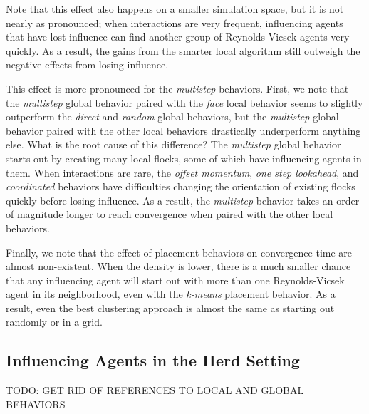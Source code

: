 Note that this effect also happens on a smaller simulation space, but it is
not nearly as pronounced; when interactions are very frequent, influencing
agents that have lost influence can find another group of Reynolds-Vicsek
agents very quickly.
As a result, the gains from the smarter local algorithm still outweigh the
negative effects from losing influence.

This effect is more pronounced for the \textit{multistep} behaviors.
First, we note that the \textit{multistep} global behavior paired with the
\textit{face} local behavior seems to slightly outperform the \textit{direct}
and \textit{random} global behaviors, but the \textit{multistep} global behavior
paired with the other local behaviors drastically underperform anything else.
What is the root cause of this difference?
The \textit{multistep} global behavior starts out by creating many local flocks,
some of which have influencing agents in them.
When interactions are rare, the \textit{offset momentum}, \textit{one step
lookahead}, and \textit{coordinated} behaviors have difficulties changing the
orientation of existing flocks quickly before losing influence.
As a result, the \textit{multistep} behavior takes an order of magnitude longer
to reach convergence when paired with the other local behaviors.

Finally, we note that the effect of placement behaviors on convergence time
are almost non-existent.
When the density is lower, there is a much smaller chance that any influencing
agent will start out with more than one Reynolds-Vicsek agent in its neighborhood,
even with the \textit{k-means} placement behavior.
As a result, even the best clustering approach is almost the same as starting
out randomly or in a grid.

\subsection{Influencing Agents in the Herd Setting}

TODO: GET RID OF REFERENCES TO LOCAL AND GLOBAL BEHAVIORS

